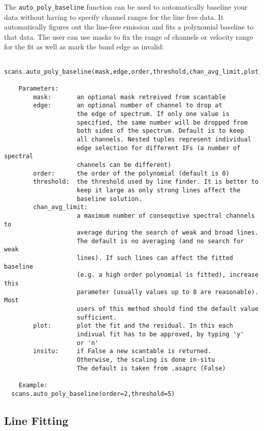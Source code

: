 The {\tt auto\_poly\_baseline} function can be used to automatically
baseline your data without having to specify channel ranges for the
line free data. It automatically figures out the line-free emission
and fits a polynomial baseline to that data. The user can use masks to
fix the range of channels or velocity range for the fit as well as
mark the band edge as invalid:


\small
\begin{verbatim}
  scans.auto_poly_baseline(mask,edge,order,threshold,chan_avg_limit,plot,insitu):

    Parameters:
        mask:       an optional mask retreived from scantable
        edge:       an optional number of channel to drop at
                    the edge of spectrum. If only one value is
                    specified, the same number will be dropped from
                    both sides of the spectrum. Default is to keep
                    all channels. Nested tuples represent individual
                    edge selection for different IFs (a number of spectral
                    channels can be different)
        order:      the order of the polynomial (default is 0)
        threshold:  the threshold used by line finder. It is better to
                    keep it large as only strong lines affect the
                    baseline solution.
        chan_avg_limit:
                    a maximum number of consequtive spectral channels to
                    average during the search of weak and broad lines.
                    The default is no averaging (and no search for weak
                    lines). If such lines can affect the fitted baseline
                    (e.g. a high order polynomial is fitted), increase this
                    parameter (usually values up to 8 are reasonable). Most
                    users of this method should find the default value
                    sufficient.
        plot:       plot the fit and the residual. In this each
                    indivual fit has to be approved, by typing 'y'
                    or 'n'
        insitu:     if False a new scantable is returned.
                    Otherwise, the scaling is done in-situ
                    The default is taken from .asaprc (False)

    Example:
  scans.auto_poly_baseline(order=2,threshold=5)
\end{verbatim}
\normalsize


\subsection{Line Fitting}
\label{subsection:sd.asap.LINEfitting}

